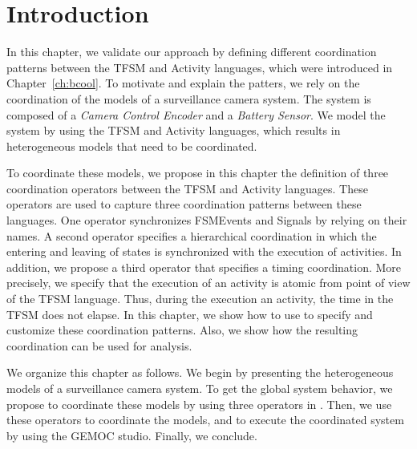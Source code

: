 \section{Introduction}
In this chapter, we validate our approach by defining different coordination patterns between the TFSM and Activity languages, which were introduced in Chapter~\ref{ch:bcool}. To motivate and explain the patters, we rely on the coordination of the models of a surveillance camera system. The system is composed of a \emph{Camera Control Encoder} and a \emph{Battery Sensor}. We model the system by using the TFSM and Activity languages, which results in heterogeneous models that need to be coordinated. 
	
To coordinate these models, we propose in this chapter the definition of three \bcool coordination operators between the TFSM and Activity languages. These operators are used to capture three coordination patterns between these languages. One operator synchronizes FSMEvents and Signals by relying on their names. A second operator specifies a hierarchical coordination in which the entering and leaving of states is synchronized with the execution of activities. In addition, we propose a third operator that specifies a timing coordination. More precisely, we specify that the execution of an activity is atomic from point of view of the TFSM language. Thus, during the execution an activity, the time in the TFSM does not elapse. In this chapter, we show how to use \bcool to specify and customize these coordination patterns. Also, we show how the resulting coordination can be used for analysis.
		
We organize this chapter as follows. We begin by presenting the heterogeneous models of a surveillance camera system. To get the global system behavior, we propose to coordinate these models by using three operators in \bcool. Then, we use these operators to coordinate the models, and to execute the coordinated system by using the GEMOC studio. Finally, we conclude.
		

